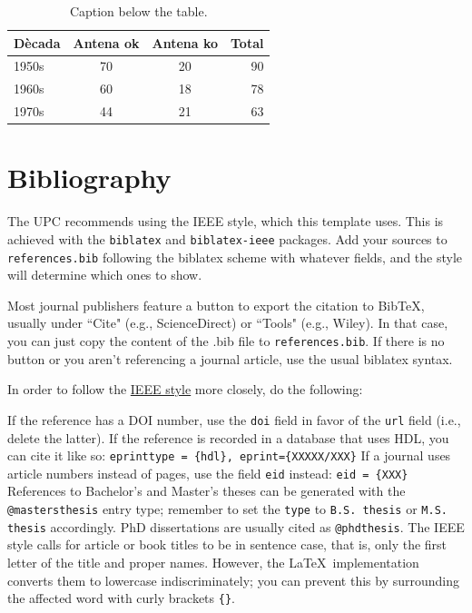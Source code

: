\begin{table}[htbp!]
    \centering
    \renewcommand{\arraystretch}{1.07}
    \begin{tabular}{@{}lccr@{}}
        \toprule
        \bfseries Dècada & \bfseries Antena ok & \bfseries Antena ko & \bfseries Total\\
        \midrule
        1950s & 70 & 20 & 90\\
        1960s & 60 & 18 & 78\\
        1970s & 44 & 21 & 63\\
        \bottomrule
    \end{tabular}
    \caption[Shorter name]{Caption below the table.}
    \label{tab:example}
\end{table}

\section{Bibliography}

The UPC recommends using the IEEE style, which this template uses. This is achieved with the \verb+biblatex+ and \verb+biblatex-ieee+ packages. Add your sources to \verb+references.bib+ following the biblatex scheme with whatever fields, and the style will determine which ones to show.

Most journal publishers feature a button to export the citation to BibTeX, usually under ``Cite" (e.g., ScienceDirect) or ``Tools" (e.g., Wiley). In that case, you can just copy the content of the .bib file to \verb+references.bib+. If there is no button or you aren't referencing a journal article, use the usual biblatex syntax.

In order to follow the \href{https://journals.ieeeauthorcenter.ieee.org/wp-content/uploads/sites/7/IEEE_Reference_Guide.pdf}{IEEE style} more closely, do the following:

\begin{outline}
    \1 If the reference has a DOI number, use the \verb+doi+ field in favor of the \verb+url+ field (i.e., delete the latter).
    \1 If the reference is recorded in a database that uses HDL, you can cite it like so:
    \2[] \verb+eprinttype = {hdl}, eprint={XXXXX/XXX}+
    \1 If a journal uses article numbers instead of pages, use the field \verb+eid+ instead:
    \2[] \verb+eid = {XXX}+
    \1 References to Bachelor's and Master's theses can be generated with the \verb+@mastersthesis+ entry type; remember to set the \verb+type+ to \verb+B.S. thesis+ or \verb+M.S. thesis+ accordingly.
    PhD dissertations are usually cited as \verb+@phdthesis+. 
    \1 The IEEE style calls for article or book titles to be in sentence case, that is, only the first letter of the title and proper names. However, the \LaTeX\ implementation converts them to lowercase indiscriminately; you can prevent this by surrounding the affected word with curly brackets \verb+{}+.
\end{outline}

